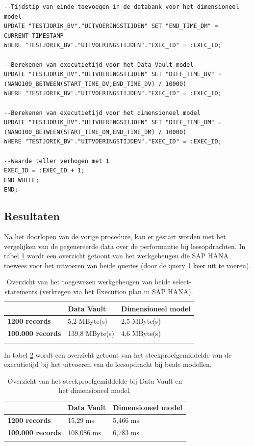 \begin{lstlisting}[frame=single]
--Tijdstip van einde toevoegen in de databank voor het dimensioneel model
UPDATE "TESTJORIK_BV"."UITVOERINGSTIJDEN" SET "END_TIME_DM" = CURRENT_TIMESTAMP
WHERE "TESTJORIK_BV"."UITVOERINGSTIJDEN"."EXEC_ID" = :EXEC_ID;

--Berekenen van executietijd voor het Data Vault model
UPDATE "TESTJORIK_BV"."UITVOERINGSTIJDEN" SET "DIFF_TIME_DV" = (NANO100_BETWEEN(START_TIME_DV,END_TIME_DV) / 10000)
WHERE "TESTJORIK_BV"."UITVOERINGSTIJDEN"."EXEC_ID" = :EXEC_ID;

--Berekenen van executietijd voor het dimensioneel model
UPDATE "TESTJORIK_BV"."UITVOERINGSTIJDEN" SET "DIFF_TIME_DM" = (NANO100_BETWEEN(START_TIME_DM,END_TIME_DM) / 10000)
WHERE "TESTJORIK_BV"."UITVOERINGSTIJDEN"."EXEC_ID" = :EXEC_ID;

--Waarde teller verhogen met 1
EXEC_ID = :EXEC_ID + 1;
END WHILE;
END;
\end{lstlisting}

\subsection{Resultaten}
Na het doorlopen van de vorige procedure, kan er gestart worden met het vergelijken van de gegenereerde data over de performantie bij leesopdrachten. In tabel \ref{tab:mem} wordt een overzicht getoont van het werkgeheugen die SAP HANA toewees voor het uitvoeren van beide queries (door de query 1 keer uit te voeren). 

\begin{center}
	\renewcommand{\arraystretch}{2}%
	\begin{longtable}{  l  p{}  p{} }
	    \ & \textbf{Data Vault} & \textbf{Dimensioneel model} \\ \hline
		\textbf{1200 records} & 5,2 MByte(s) & 2,5 MByte(s) \\
		\textbf{100.000 records} & 139,8 MByte(s) & 4,6 MByte(s) \\
		\caption{Overzicht van het toegewezen werkgeheugen van beide select-statements (verkregen via het Execution plan in SAP HANA).}
		\label{tab:mem}
	\end{longtable}
\end{center}

In tabel \ref{tab:spg} wordt een overzicht getoont van het steekproefgemiddelde van de executietijd bij het uitvoeren van de leesopdracht bij beide modellen.

\begin{center}
	\renewcommand{\arraystretch}{2}%
	\begin{longtable}{  l  p{}  p{} }
		\ & \textbf{Data Vault} & \textbf{Dimensioneel model} \\ \hline
		 \textbf{1200 records} & 15,29 ms & 5,466 ms \\
		 \textbf{100.000 records} & 108,086 ms & 6,783 ms \\
		\caption{Overzicht van het steekproefgemiddelde bij Data Vault en het dimensioneel model.}
		\label{tab:spg}
	\end{longtable}
\end{center}

